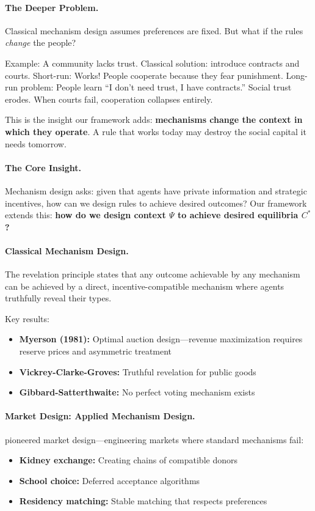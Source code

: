 \paragraph{The Deeper Problem.}
Classical mechanism design assumes preferences are fixed. But what if the rules \emph{change} the people?

Example: A community lacks trust. Classical solution: introduce contracts and courts.
Short-run: Works! People cooperate because they fear punishment.
Long-run problem: People learn ``I don't need trust, I have contracts.''
Social trust erodes. When courts fail, cooperation collapses entirely.

This is the insight our framework adds: \textbf{mechanisms change the context in which they operate}.
A rule that works today may destroy the social capital it needs tomorrow.

\paragraph{The Core Insight.}
Mechanism design \citep{hurwicz1960,myerson1981,maskin1999} asks: given that agents have
private information and strategic incentives, how can we design rules to achieve
desired outcomes? Our framework extends this: \textbf{how do we design context $\Psi$
to achieve desired equilibria $C^*$?}

\paragraph{Classical Mechanism Design.}
The revelation principle \citep{myerson1979} states that any outcome achievable
by any mechanism can be achieved by a direct, incentive-compatible mechanism
where agents truthfully reveal their types.

Key results:
\begin{itemize}
  \item \textbf{Myerson (1981):} Optimal auction design---revenue maximization
        requires reserve prices and asymmetric treatment
  \item \textbf{Vickrey-Clarke-Groves:} Truthful revelation for public goods
  \item \textbf{Gibbard-Satterthwaite:} No perfect voting mechanism exists
\end{itemize}

\paragraph{Market Design: Applied Mechanism Design.}
\citet{roth2002,roth2015} pioneered market design---engineering markets where
standard mechanisms fail:
\begin{itemize}
  \item \textbf{Kidney exchange:} Creating chains of compatible donors
  \item \textbf{School choice:} Deferred acceptance algorithms
  \item \textbf{Residency matching:} Stable matching that respects preferences
\end{itemize}

